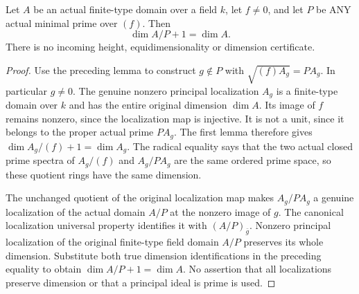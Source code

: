 \begin{theorem}
\label{thm:pl-gauss-affine-principal-component-dimension}
\leanok
Let $A$ be an actual finite-type domain over a field $k$, let $f\ne0$,
and let $P$ be ANY actual minimal prime over $(f)$. Then
\[
 \dim A/P+1=\dim A.
\]
There is no incoming height, equidimensionality or dimension certificate.
\end{theorem}
\begin{proof}
Use the preceding lemma to construct $g\notin P$ with
$\sqrt{(f)A_g}=PA_g$. In particular $g\ne0$. The genuine nonzero
principal localization $A_g$ is a finite-type domain over $k$ and has
the entire original dimension $\dim A$. Its image of $f$ remains
nonzero, since the localization map is injective. It is not a unit,
since it belongs to the proper actual prime $PA_g$. The first lemma
therefore gives
$\dim A_g/(f)+1=\dim A_g$. The radical equality says that the two
actual closed prime spectra of $A_g/(f)$ and $A_g/PA_g$ are the same
ordered prime space, so these quotient rings have the same dimension.

The unchanged quotient of the original localization map makes
$A_g/PA_g$ a genuine localization of the actual domain $A/P$ at the
nonzero image of $g$. The canonical localization universal property
identifies it with $(A/P)_{\bar g}$. Nonzero principal localization of
the original finite-type field domain $A/P$ preserves its whole
dimension. Substitute both true dimension identifications in the
preceding equality to obtain $\dim A/P+1=\dim A$. No assertion that
all localizations preserve dimension or that a principal ideal is
prime is used.
\end{proof}

